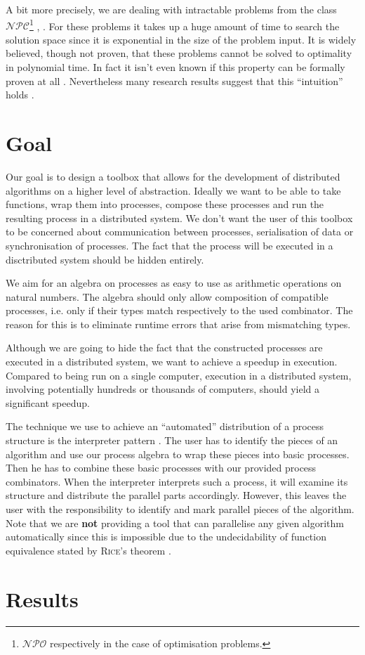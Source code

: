 A bit more precisely, we are dealing with intractable problems from the class $\mathcal{NPC}$\footnote{$\mathcal{NPO}$ respectively in the case of optimisation problems.} \cite{Garey:1979:CIG:578533}, \cite{Hopcroft:2006:IAT:1196416}. For these problems it takes up a huge amount of time to search the solution space since it is exponential in the size of the problem input. It is widely believed, though not proven, that these problems cannot be solved to optimality in polynomial time. In fact it isn't even known if this property can be formally proven at all \cite{}. Nevertheless many research results suggest that this \enquote{intuition} holds \cite{} \cite{} \cite{}.

\section{Goal}
\label{chp:goal}
Our goal is to design a toolbox that allows for the development of distributed algorithms on a higher level of abstraction. Ideally we want to be able to take functions, wrap them into processes, compose these processes and run the resulting process in a distributed system. We don't want the user of this toolbox to be concerned about communication between processes, serialisation of data or synchronisation of processes. The fact that the process will be executed in a disctributed system should be hidden entirely.

We aim for an algebra on processes as easy to use as arithmetic operations on natural numbers. The algebra should only allow composition of compatible processes, i.e. only if their types match respectively to the used combinator. The reason for this is to eliminate runtime errors that arise from mismatching types.

Although we are going to hide the fact that the constructed processes are executed in a distributed system, we want to achieve a speedup in execution. Compared to being run on a single computer, execution in a distributed system, involving potentially hundreds or thousands of computers, should yield a significant speedup.

The technique we use to achieve an \enquote{automated} distribution of a process structure is the interpreter pattern \cite{Gamma:1995:DPE:186897}. The user has to identify the pieces of an algorithm and use our process algebra to wrap these pieces into basic processes. Then he has to combine these basic processes with our provided process combinators. When the interpreter interprets such a process, it will examine its structure and distribute the parallel parts accordingly. However, this leaves the user with the responsibility to identify and mark parallel pieces of the algorithm. Note that we are \textbf{not} providing a tool that can parallelise any given algorithm automatically since this is impossible due to the undecidability of function equivalence stated by \textsc{Rice}'s theorem \cite{}.

\section{Results}
\lipsum[1-6]